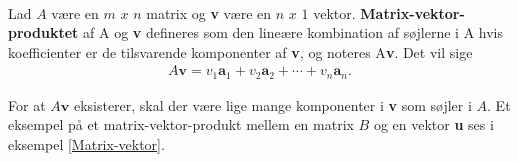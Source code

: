 \begin{defn}{}{}
\phantom{gdfs}\\Lad $A$ være en $m$ $x$ $n$ matrix og \textbf{v} være en $n$ $x$ $1$ vektor. \textbf{Matrix-vektor-produktet} af A og \textbf{v} defineres som den lineære kombination af søjlerne i A hvis koefficienter er de tilsvarende komponenter af \textbf{v}, og noteres A\textbf{v}. Det vil sige
\begin{align*}
A\textbf{v} =v_1\textbf{a}_1 + v_2\textbf{a}_2 + \cdots + v_n\textbf{a}_n.
\end{align*}
\end{defn}
\noindent
For at $A\textbf{v}$ eksisterer, skal der være lige mange komponenter i \textbf{v} som søjler i $A$. Et eksempel på et matrix-vektor-produkt mellem en matrix $B$ og en vektor \textbf{u} ses i eksempel \ref{Matrix-vektor}.
